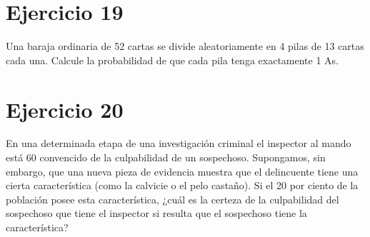 \documentclass[12pt]{article}
\begin{document}
\section{Ejercicio 19}
Una baraja ordinaria de 52 cartas se divide aleatoriamente en 4 pilas de 13 cartas cada una.
Calcule la probabilidad de que cada pila tenga exactamente 1 As.
\section{Ejercicio 20}
 En una determinada etapa de una investigación criminal el inspector al mando está 60 %
convencido de la culpabilidad de un sospechoso. Supongamos, sin embargo, que una nueva
pieza de evidencia muestra que el delincuente tiene una cierta característica (como la calvicie
o el pelo castaño). Si el 20 por ciento de la población posee esta característica, ¿cuál es la
certeza de la culpabilidad del sospechoso que tiene el inspector si resulta que el sospechoso
tiene la característica?
\end{document}
